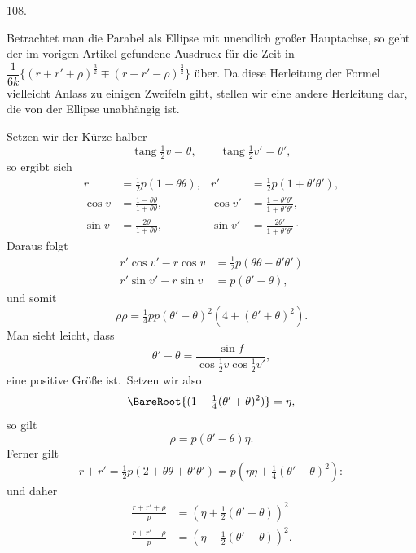 \par{}\medskip
\hypertarget{native-149-article108}{}
\begin{center}108.\end{center}
Betrachtet man die Parabel als Ellipse mit unendlich großer Hauptachse, so geht der im vorigen Artikel gefundene Ausdruck für die Zeit in $\dfrac1{6k}\{(r+r'+\rho)^{\frac32}\mp(r+r'-\rho)^{\frac32}\}$ über. Da diese Herleitung der Formel vielleicht Anlass zu einigen Zweifeln gibt, stellen wir eine andere Herleitung dar, die von der Ellipse unabhängig ist.
\par{}
Setzen wir der Kürze halber
\[
\operatorname{tang}\tfrac12v=\theta,\qquad\operatorname{tang}\tfrac12v'=\theta',
\]
\noindent so ergibt sich
\[
\begin{aligned}
r&=\tfrac12p(1+\theta\theta),&r'&=\tfrac12p(1+\theta'\theta'),\\[.6em]
\cos v&=\frac{1-\theta\theta}{1+\theta\theta},&\cos v'&=\frac{1-\theta'\theta'}{1+\theta'\theta'},\\[.6em]
\sin v&=\frac{2\theta}{1+\theta\theta},&\sin v'&=\frac{2\theta'}{1+\theta'\theta'}\mathpunct{\cdot}
\end{aligned}
\]
\noindent Daraus folgt
\[
\begin{aligned}
r'\cos v'-r\cos v&=\tfrac12p(\theta\theta-\theta'\theta')\\[.6em]
r'\sin v'-r\sin v&=p(\theta'-\theta),
\end{aligned}
\]
\noindent und somit
\[
\rho\rho=\tfrac14pp(\theta'-\theta)^2(4+(\theta'+\theta)^2).
\]
\begingroup{}
\noindent Man sieht leicht, dass
\[
\theta'-\theta=\frac{\sin f}{\cos\tfrac12v\cos\tfrac12v'},
\]
\noindent eine positive Größe ist.\endgroup\ Setzen wir also
\[
\BareRoot{(1+\tfrac14(\theta'+\theta)^2)}=\eta,
\]
\noindent so gilt
\[
\rho=p(\theta'-\theta)\eta.
\]
\noindent Ferner gilt
\[
r+r'=\tfrac12p(2+\theta\theta+\theta'\theta')=p(\eta\eta+\tfrac14(\theta'-\theta)^2):
\]
\noindent und daher
\[
\begin{aligned}
\frac{r+r'+\rho}{p}&=(\eta+\tfrac12(\theta'-\theta))^2\\[.6em]
\frac{r+r'-\rho}{p}&=(\eta-\tfrac12(\theta'-\theta))^2.
\end{aligned}
\]
